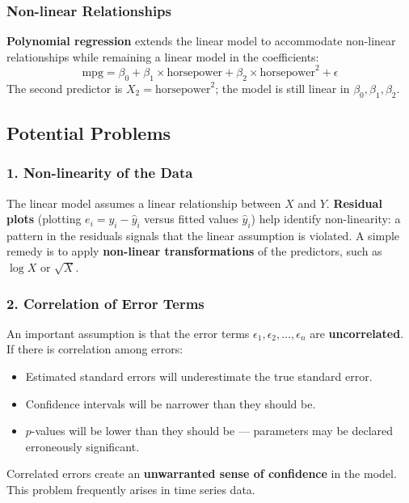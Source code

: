 \documentclass[11pt,a4paper]{article}
\theoremstyle{definition}
\theoremstyle{plain}
\theoremstyle{remark}
\begin{document}
\subsubsection{Non-linear Relationships}

\textbf{Polynomial regression} extends the linear model to accommodate non-linear relationships while remaining a linear model in the coefficients:
\[
    \text{mpg} = \beta_0 + \beta_1 \times \text{horsepower} + \beta_2 \times \text{horsepower}^2 + \epsilon
\]
The second predictor is $X_2 = \text{horsepower}^2$; the model is still linear in $\beta_0, \beta_1, \beta_2$.

\subsection{Potential Problems}

\subsubsection{1. Non-linearity of the Data}

The linear model assumes a linear relationship between $X$ and $Y$. \textbf{Residual plots} (plotting $e_i = y_i - \hat{y}_i$ versus fitted values $\hat{y}_i$) help identify non-linearity: a pattern in the residuals signals that the linear assumption is violated. A simple remedy is to apply \textbf{non-linear transformations} of the predictors, such as $\log X$ or $\sqrt{X}$.

\subsubsection{2. Correlation of Error Terms}

An important assumption is that the error terms $\epsilon_1, \epsilon_2, \ldots, \epsilon_n$ are \textbf{uncorrelated}. If there is correlation among errors:
\begin{itemize}
    \item Estimated standard errors will underestimate the true standard error.
    \item Confidence intervals will be narrower than they should be.
    \item $p$-values will be lower than they should be — parameters may be declared erroneously significant.
\end{itemize}
Correlated errors create an \textbf{unwarranted sense of confidence} in the model. This problem frequently arises in time series data.
\end{document}
